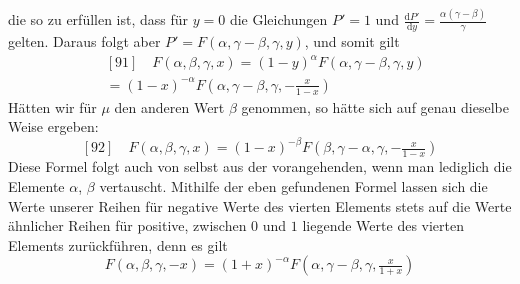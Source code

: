 die so zu erfüllen ist, dass für $y=0$ die Gleichungen $P'=1$ und $\frac{\mathrm{d}P'}{\mathrm{d}y}=\frac{\alpha(\gamma-\beta)}{\gamma}$ gelten. Daraus folgt aber $P'=F(\alpha,\gamma-\beta,\gamma,y)$, und somit gilt
\[
\begin{aligned}&[91]\quad F(\alpha,\beta,\gamma,x)=(1-y)^\alpha F(\alpha,\gamma-\beta,\gamma,y)\\&=(1-x)^{-\alpha}F(\alpha,\gamma-\beta,\gamma,-\tfrac{x}{1-x})\end{aligned}
\]
Hätten wir für $\mu$ den anderen Wert $\beta$ genommen, so hätte sich auf genau dieselbe Weise ergeben:
\[
[92]\quad F(\alpha,\beta,\gamma,x)=(1-x)^{-\beta}F(\beta,\gamma-\alpha,\gamma,-\tfrac{x}{1-x})
\]
Diese Formel folgt auch von selbst aus der vorangehenden, wenn man lediglich die Elemente $\alpha$, $\beta$ vertauscht. Mithilfe der eben gefundenen Formel lassen sich die Werte unserer Reihen für negative Werte des vierten Elements stets auf die Werte ähnlicher Reihen für positive, zwischen $0$ und $1$ liegende Werte des vierten Elements zurückführen, denn es gilt
\[
F(\alpha,\beta,\gamma,-x)=(1+x)^{-\alpha}F(\alpha,\gamma-\beta,\gamma,\tfrac{x}{1+x})
\]
